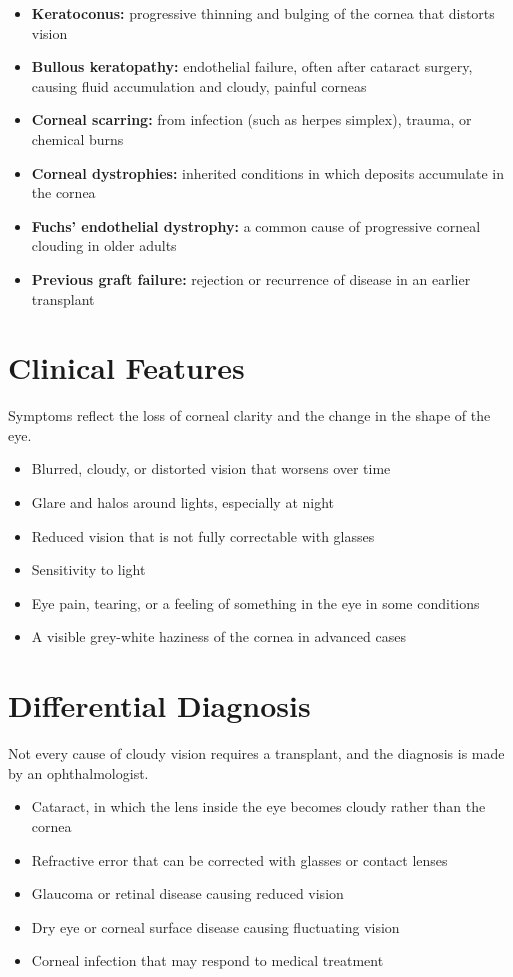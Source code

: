 \begin{itemize}
    \item \textbf{Keratoconus:} progressive thinning and bulging of the cornea that distorts vision
    \item \textbf{Bullous keratopathy:} endothelial failure, often after cataract surgery, causing fluid accumulation and cloudy, painful corneas
    \item \textbf{Corneal scarring:} from infection (such as herpes simplex), trauma, or chemical burns
    \item \textbf{Corneal dystrophies:} inherited conditions in which deposits accumulate in the cornea
    \item \textbf{Fuchs' endothelial dystrophy:} a common cause of progressive corneal clouding in older adults
    \item \textbf{Previous graft failure:} rejection or recurrence of disease in an earlier transplant
\end{itemize}

\section*{Clinical Features}
Symptoms reflect the loss of corneal clarity and the change in the shape of the eye.

\begin{itemize}
    \item Blurred, cloudy, or distorted vision that worsens over time
    \item Glare and halos around lights, especially at night
    \item Reduced vision that is not fully correctable with glasses
    \item Sensitivity to light
    \item Eye pain, tearing, or a feeling of something in the eye in some conditions
    \item A visible grey-white haziness of the cornea in advanced cases
\end{itemize}

\section*{Differential Diagnosis}
Not every cause of cloudy vision requires a transplant, and the diagnosis is made by an ophthalmologist.

\begin{itemize}
    \item Cataract, in which the lens inside the eye becomes cloudy rather than the cornea
    \item Refractive error that can be corrected with glasses or contact lenses
    \item Glaucoma or retinal disease causing reduced vision
    \item Dry eye or corneal surface disease causing fluctuating vision
    \item Corneal infection that may respond to medical treatment
\end{itemize}

